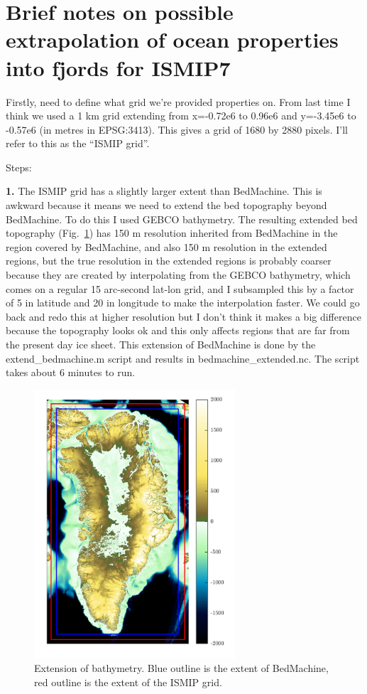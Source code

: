 \documentclass[11pt]{article}
\begin{document}
\section*{Brief notes on possible extrapolation of ocean properties into fjords for ISMIP7}

Firstly, need to define what grid we’re provided properties on. From last time I think we used a 1 km grid extending from x=-0.72e6 to 0.96e6 and y=-3.45e6 to -0.57e6 (in metres in EPSG:3413). This gives a grid of 1680 by 2880 pixels. I’ll refer to this as the “ISMIP grid”.

Steps:

\textbf{1.} The ISMIP grid has a slightly larger extent than BedMachine. This is awkward because it means we need to extend the bed topography beyond BedMachine. To do this I used GEBCO bathymetry. The resulting extended bed topography (Fig.~\ref{extended_bathy}) has 150 m resolution inherited from BedMachine in the region covered by BedMachine, and also 150 m resolution in the extended regions, but the true resolution in the extended regions is probably coarser because they are created by interpolating from the GEBCO bathymetry, which comes on a regular 15 arc-second lat-lon grid, and I subsampled this by a factor of 5 in latitude and 20 in longitude to make the interpolation faster. We could go back and redo this at higher resolution but I don’t think it makes a big difference because the topography looks ok and this only affects regions that are far from the present day ice sheet. This extension of BedMachine is done by the extend\_bedmachine.m script and results in bedmachine\_extended.nc. The script takes about 6 minutes to run.

\begin{figure}[h!]
\centering
\includegraphics[width=7.5cm]{extended_bathy.png}
\caption{Extension of bathymetry. Blue outline is the extent of BedMachine, red outline is the extent of the ISMIP grid.}
\label{extended_bathy}
\end{figure}
\end{document}
